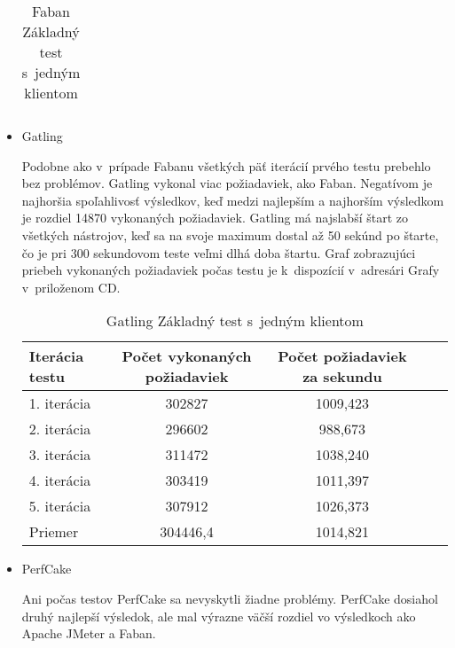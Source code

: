 \documentclass[12pt,oneside,final]{fithesis-utf8}
\begin{document}
\begin{itemize}
\begin{table}[H]
\begin{center}
\begin{tabular}{ | l | c | c | c | c |}
\end{tabular}
\end{center}
\caption{Faban Základný test s~jedným klientom}
\end{table}


\item Gatling

Podobne ako v~prípade Fabanu všetkých päť iterácií prvého testu prebehlo bez problémov. Gatling vykonal viac požiadaviek, ako Faban. Negatívom je najhoršia spoľahlivosť výsledkov, keď medzi najlepším a najhorším výsledkom je rozdiel 14870 vykonaných požiadaviek. Gatling má najslabší štart zo všetkých nástrojov, keď sa na svoje maximum dostal až 50 sekúnd po štarte, čo je pri 300 sekundovom teste veľmi dlhá doba štartu. Graf zobrazujúci priebeh vykonaných požiadaviek počas testu je k~dispozícií v~adresári Grafy v~priloženom CD.

\begin{table}[H]
\begin{center}
\begin{tabular}{ | l | c | c | c | c |}
		\hline
		 \textbf{Iterácia testu} & \textbf{Počet vykonaných požiadaviek} & \textbf{Počet požiadaviek za sekundu} \\ \hline
		 1. iterácia & 302827 & 1009,423 \\ \hline
		 2. iterácia & 296602 & 988,673 \\ \hline
		 3. iterácia & 311472 & 1038,240 \\ \hline
		 4. iterácia & 303419 & 1011,397 \\ \hline
		 5. iterácia & 307912 & 1026,373 \\ \hline
		 Priemer & 304446,4 & 1014,821 \\ \hline
		 
\end{tabular}
\end{center}
\caption{Gatling Základný test s~jedným klientom}
\end{table}


\item PerfCake

Ani počas testov PerfCake sa nevyskytli žiadne problémy. PerfCake dosiahol druhý najlepší výsledok, ale mal výrazne väčší rozdiel vo výsledkoch ako Apache JMeter a Faban.


\end{itemize}
\end{document}
